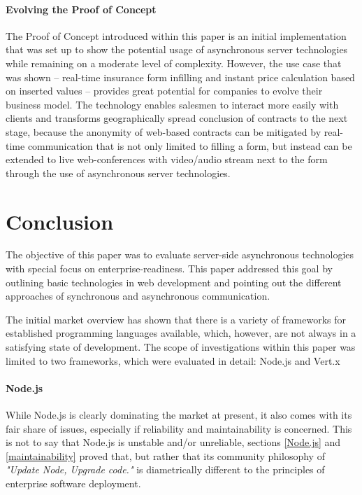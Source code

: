\paragraph{Evolving the Proof of Concept} The Proof of Concept introduced within this paper is an initial implementation that was set up to show the potential usage of asynchronous server technologies while remaining on a moderate level of complexity. However, the use case that was shown -- real-time insurance form infilling and instant price calculation based on inserted values -- provides great potential for companies to evolve their business model. The technology enables salesmen to interact more easily with clients and transforms geographically spread conclusion of contracts to the next stage, because the anonymity of web-based contracts can be mitigated by real-time communication that is not only limited to filling a form, but instead can be extended to live web-conferences with video/audio stream next to the form through the use of asynchronous server technologies. 


\section{Conclusion}
\label{conclusion}

The objective of this paper was to evaluate server-side asynchronous technologies with special focus on enterprise-readiness. This paper addressed this goal by outlining basic technologies in web development and pointing out the different approaches of synchronous and asynchronous communication.

The initial market overview has shown that there is a variety of frameworks for established programming languages available, which, however, are not always in a satisfying state of development. The scope of investigations within this paper was limited to two frameworks, which were evaluated in detail: Node.js and Vert.x\\

\paragraph{Node.js} While Node.js is clearly dominating the market at present, it also comes with its fair share of issues, especially if reliability and maintainability is concerned. This is not to say that Node.js is unstable and/or unreliable, sections \ref{Node.js} and \ref{maintainability} proved that, but rather that its community philosophy of \textit{"Update Node, Upgrade code."} is diametrically different to the principles of enterprise software deployment.\\

